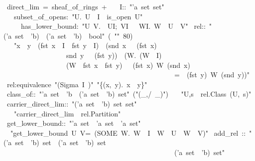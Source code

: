 \documentclass[12pt]{scrartcl}
\begin{document}
\begin{isabelle}
\ direct\_lim\ =\ sheaf\_of\_rings\ +\isanewline
\ \ \ I::\ "'a\ set\ set"\isanewline
\ \ \ subset\_of\_opens:\ "\isasymAnd U.\ U\ \isasymin \ I\ \isasymLongrightarrow \ is\_open\ U"\isanewline
\ \ \ \ \ has\_lower\_bound:\ "\isasymAnd U\ V.\ \isasymlbrakk \ U\isasymin I;\ V\isasymin I\ \isasymrbrakk \ \isasymLongrightarrow \ \isasymexists W\isasymin I.\ W\ \isasymsubseteq \ U\ \isasyminter \ V"\isanewline
{}\isanewline
\isanewline
{}\ rel::\ "('a\ set\ \isasymtimes \ 'b)\ \isasymRightarrow \ ('a\ set\ \isasymtimes \ 'b)\ \isasymRightarrow \ bool"\ (\ "\isasymsim "\ 80)\isanewline
\ \ \ "x\ \isasymsim \ y\ \isasymequiv \ (fst\ x\ \isasymin \ I\ \isasymand \ fst\ y\ \isasymin \ I)\ \isasymand \ (snd\ x\ \isasymin \ \isasymFF \ (fst\ x)\ \isanewline
\ \ \ \ \ \ \ \ \ \ \ \ \ \ \ \ \ \isasymand \ snd\ y\ \isasymin \ \isasymFF \ (fst\ y))\ \isasymand \ (\isasymexists W.\ (W\ \isasymin \ I)\ \isanewline
\ \ \ \ \ \ \ \ \ \ \ \ \ \ \ \ \ \isasymand \ (W\ \isasymsubseteq \ fst\ x\ \isasyminter \ fst\ y)\ \isasymand \ \isasymrho \ (fst\ x)\ W\ (snd\ x)\ \isanewline
\ \ \ \ \ \ \ \ \ \ \ \ \ \ \ \ \ \ \ \ \ \ \ \ \ \ \ \ \ \ \ \ \ \ \ \ \ \ \ \ \ \ \ \ \ \ \ \ \ =\ \isasymrho \ (fst\ y)\ W\ (snd\ y))"\isanewline
\isanewline
{}\ rel:equivalence\ "(Sigma\ I\ \isasymFF )"\ "\{(x,\ y).\ x\ \isasymsim \ y\}"\isanewline
\isanewline
{}\ class\_of::\ "'a\ set\ \isasymRightarrow \ 'b\ \isasymRightarrow \ ('a\ set\ \isasymtimes \ 'b)\ set"\ ("\isasymlfloor (\_,/\ \_)\isasymrfloor ")\isanewline
\ \ \ "\isasymlfloor U,s\isasymrfloor \ \isasymequiv \ rel.Class\ (U,\ s)"\isanewline
\isanewline
{}\ carrier\_direct\_lim::\ "('a\ set\ \isasymtimes \ 'b)\ set\ set"\isanewline
\ \ \ "carrier\_direct\_lim\ \isasymequiv \ rel.Partition"\isanewline
\isanewline
{}\ get\_lower\_bound::\ "'a\ set\ \isasymRightarrow \ 'a\ set\ \isasymRightarrow \ 'a\ set"\ \isanewline
\ \ "get\_lower\_bound\ U\ V=\ (SOME\ W.\ W\ \isasymin \ I\ \isasymand \ W\ \isasymsubseteq \ U\ \isasymand \ W\ \isasymsubseteq \ V)"\isanewline
\isanewline
{}\ add\_rel\ ::\ "('a\ set\ \isasymtimes \ 'b)\ set\ \isasymRightarrow \ ('a\ set\ \isasymtimes \ 'b)\ set\ \isanewline
\ \ \ \ \ \ \ \ \ \ \ \ \ \ \ \ \ \ \ \ \ \ \ \ \ \ \ \ \ \ \ \ \ \ \ \ \ \ \ \ \ \ \ \ \ \ \ \ \isasymRightarrow \ ('a\ set\ \isasymtimes \ 'b)\ set"\isanewline

\end{isabelle}
\end{document}
